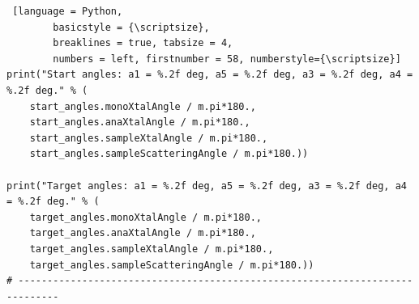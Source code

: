 \begin{listing}[htb]
\begin{lstlisting} [language = Python, 
		basicstyle = {\scriptsize},
		breaklines = true, tabsize = 4,
		numbers = left, firstnumber = 58, numberstyle={\scriptsize}]
print("Start angles: a1 = %.2f deg, a5 = %.2f deg, a3 = %.2f deg, a4 = %.2f deg." % (
	start_angles.monoXtalAngle / m.pi*180.,
	start_angles.anaXtalAngle / m.pi*180.,
	start_angles.sampleXtalAngle / m.pi*180.,
	start_angles.sampleScatteringAngle / m.pi*180.))

print("Target angles: a1 = %.2f deg, a5 = %.2f deg, a3 = %.2f deg, a4 = %.2f deg." % (
	target_angles.monoXtalAngle / m.pi*180.,
	target_angles.anaXtalAngle / m.pi*180.,
	target_angles.sampleXtalAngle / m.pi*180.,
	target_angles.sampleScatteringAngle / m.pi*180.))
# -----------------------------------------------------------------------------
	\end{lstlisting}
	\caption[Python workflow example 2/3.]{Script showing an example workflow in \textit{Python}.
	Part 2 of 3: Calculation of the path mesh and the start and target positions from their crystal coordinates.
	\label{lst:pyworkflow2}}
\end{listing}


